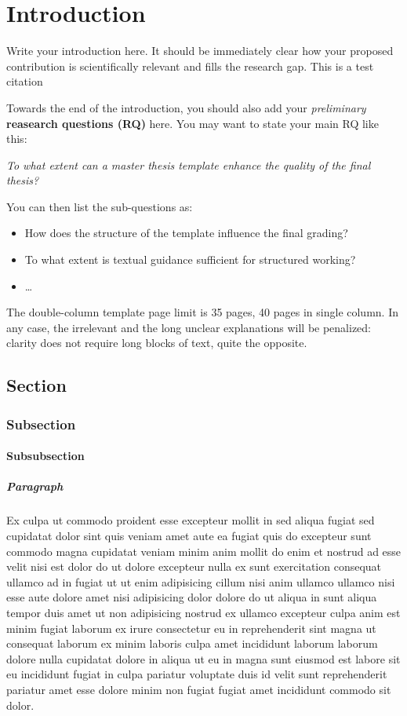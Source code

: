 \chapter{Introduction}
\label{sec:introduction}
Write your introduction here. It should be immediately clear how your proposed contribution is scientifically relevant and fills the research gap.
  This is a test citation \cite{Gruber1995}

Towards the end of the introduction, you should also add your \textit{preliminary} \textbf{reasearch questions (RQ)} here. You may want to state your main RQ like this:

\noindent\textit{To what extent can a master thesis template enhance the quality of the final thesis?}

You can then list the sub-questions as:
\begin{itemize}
    \item How does the structure of the template influence the final grading?
    \item To what extent is textual guidance sufficient for structured working?
    \item \dots
\end{itemize}


The double-column template page limit is 35 pages, 40 pages in single column. In any case, the irrelevant and the long unclear explanations will be penalized: clarity does not require long blocks of text, quite the opposite.


\section{Section}
  \subsection{Subsection}
    \subsubsection{Subsubsection}
      \paragraph{Paragraph} Ex culpa ut commodo proident esse excepteur mollit in sed aliqua fugiat sed cupidatat dolor sint quis veniam amet aute ea fugiat quis do excepteur sunt commodo magna cupidatat veniam minim anim mollit do enim et nostrud ad esse velit nisi est dolor do ut dolore excepteur nulla ex sunt exercitation consequat ullamco ad in fugiat ut ut enim adipisicing cillum nisi anim ullamco ullamco nisi esse aute dolore amet nisi adipisicing dolor dolore do ut aliqua in sunt aliqua tempor duis amet ut non adipisicing nostrud ex ullamco excepteur culpa anim est minim fugiat laborum ex irure consectetur eu in reprehenderit sint magna ut consequat laborum ex minim laboris culpa amet incididunt laborum laborum dolore nulla cupidatat dolore in aliqua ut eu in magna sunt eiusmod est labore sit eu incididunt fugiat in culpa pariatur voluptate duis id velit sunt reprehenderit pariatur amet esse dolore minim non fugiat fugiat amet incididunt commodo sit dolor.

